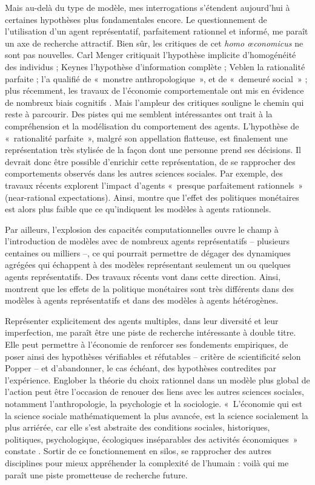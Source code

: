 Mais au-delà du type de modèle, mes interrogations s'étendent aujourd'hui à certaines hypothèses plus fondamentales encore. 
Le questionnement de l’utilisation d’un agent représentatif, parfaitement rationnel et informé, me paraît un axe de recherche attractif. Bien sûr, les critiques de cet \textit{homo \oe{}conomicus} ne sont pas nouvelles. Carl Menger critiquait l’hypothèse implicite d’homogénéité des individus ; Keynes l’hypothèse d’information complète ; Veblen la rationalité parfaite ; \citet{Bourdieu1977} l’a qualifié de «~monstre anthropologique~», et \citet{Sen2012} de «~demeuré social~» ; plus récemment, les travaux de l’économie comportementale ont mis en évidence de nombreux biais cognitifs \citep{Thaler2009,Kahneman2011}.
Mais l’ampleur des critiques souligne le chemin qui reste à parcourir. Des pistes qui me semblent intéressantes ont trait à la compréhension et la modélisation du comportement des agents. L'hypothèse de «~rationalité parfaite~», malgré son appellation flatteuse, est finalement une représentation très stylisée de la façon dont une personne prend ses décisions. Il devrait donc être possible d'enrichir cette représentation, de se rapprocher des comportements observés dans les autres sciences sociales. Par exemple, des travaux récents explorent l’impact d’agents «~presque parfaitement rationnels~» (near-rational expectations). Ainsi, \citet{Farhi2016} montre que l’effet des politiques monétaires est alors plus faible que ce qu’indiquent les modèles à agents rationnels.

Par ailleurs, l’explosion des capacités computationnelles ouvre le champ à l’introduction de modèles avec de nombreux agents représentatifs – plusieurs centaines ou milliers –, ce qui pourrait permettre de dégager des dynamiques agrégées qui échappent à des modèles représentant seulement un ou quelques agents représentatifs. Des travaux récents vont dans cette direction. Ainsi, \citet{Kaplan2016} montrent que les effets de la politique monétaires sont très différents dans des modèles à agents représentatifs et dans des modèles à agents hétérogènes.

Représenter explicitement des agents multiples, dans leur diversité et leur imperfection, me paraît être une piste de recherche intéressante à double titre. Elle peut permettre à l’économie de renforcer ses fondements empiriques, de poser ainsi des hypothèses vérifiables et réfutables – critère de scientificité selon Popper – et d’abandonner, le cas échéant, des hypothèses contredites par l’expérience. Englober la théorie du choix rationnel dans un modèle plus global de l’action peut être l’occasion de renouer des liens avec les autres sciences sociales, notamment l’anthropologie, la psychologie et la sociologie. «~L'économie qui est la science sociale mathématiquement la plus avancée, est la science socialement la plus arriérée, car elle s'est abstraite des conditions sociales, historiques, politiques, psychologique, écologiques inséparables des activités économiques~» constate \citet{Morin1999}. Sortir de ce fonctionnement en silos, se rapprocher des autres disciplines pour mieux appréhender la complexité de l'humain : voilà qui me paraît une piste prometteuse de recherche future.





